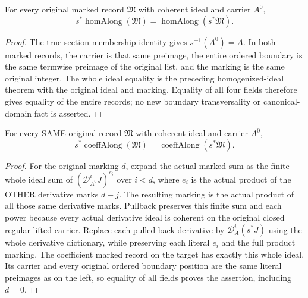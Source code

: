 \begin{theorem}
\label{hir:actual-zero-section-submanifold-whole-homogenized-marked}
\leanok
For every original marked record $\mathfrak M$ with coherent ideal and carrier $A^0$,
\[
 s^*\operatorname{homAlong}(\mathfrak M)=\operatorname{homAlong}(s^*\mathfrak M).
\]
\end{theorem}
\begin{proof}
The true section membership identity gives $s^{-1}(A^0)=A$. In both marked records, the carrier is that same preimage, the entire ordered boundary is the same termwise preimage of the original list, and the marking is the same original integer. The whole ideal equality is the preceding homogenized-ideal theorem with the original ideal and marking. Equality of all four fields therefore gives equality of the entire records; no new boundary transversality or canonical-domain fact is asserted.
\end{proof}

\begin{theorem}
\label{hir:actual-zero-section-submanifold-whole-coefficient-marked}
\leanok
For every SAME original record $\mathfrak M$ with coherent ideal and carrier $A^0$,
\[
 s^*\operatorname{coeffAlong}(\mathfrak M)=\operatorname{coeffAlong}(s^*\mathfrak M).
\]
\end{theorem}
\begin{proof}
For the original marking $d$, expand the actual marked sum as the finite whole ideal sum of $(\mathcal D_{A^0}^iJ)^{e_i}$ over $i<d$, where $e_i$ is the actual product of the OTHER derivative marks $d-j$. The resulting marking is the actual product of all those same derivative marks. Pullback preserves this finite sum and each power because every actual derivative ideal is coherent on the original closed regular lifted carrier. Replace each pulled-back derivative by $\mathcal D_A^i(s^*J)$ using the whole derivative dictionary, while preserving each literal $e_i$ and the full product marking. The coefficient marked record on the target has exactly this whole ideal. Its carrier and every original ordered boundary position are the same literal preimages as on the left, so equality of all fields proves the assertion, including $d=0$.
\end{proof}

